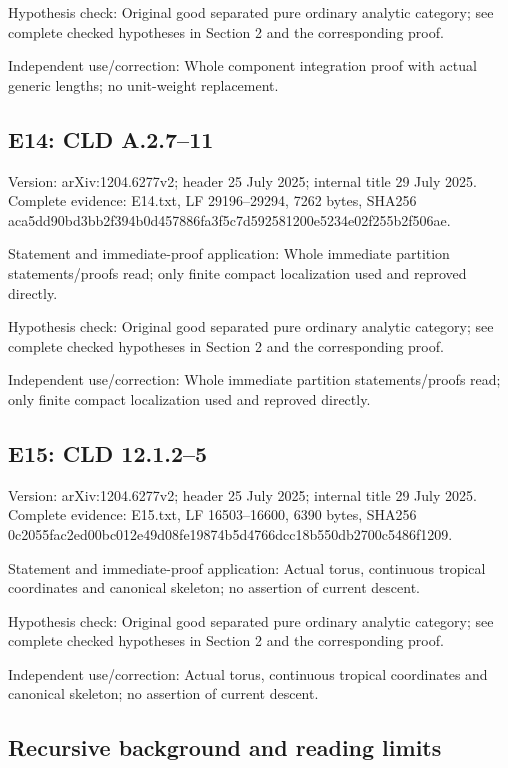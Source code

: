 \documentclass[11pt]{article}
\begin{document}
Hypothesis check: Original good separated pure ordinary analytic category; see complete checked hypotheses in Section 2 and the corresponding proof.

Independent use/correction: Whole component integration proof with actual generic lengths; no unit-weight replacement.

\subsection{E14: CLD A.2.7--11}

Version: arXiv:1204.6277v2; header 25 July 2025; internal title 29 July 2025. Complete evidence: E14.txt, LF 29196--29294, 7262 bytes, SHA256 aca5dd90bd3bb2f394b0d457886fa3f5c7d592581200e5234e02f255b2f506ae.

Statement and immediate-proof application: Whole immediate partition statements/proofs read; only finite compact localization used and reproved directly.

Hypothesis check: Original good separated pure ordinary analytic category; see complete checked hypotheses in Section 2 and the corresponding proof.

Independent use/correction: Whole immediate partition statements/proofs read; only finite compact localization used and reproved directly.

\subsection{E15: CLD 12.1.2--5}

Version: arXiv:1204.6277v2; header 25 July 2025; internal title 29 July 2025. Complete evidence: E15.txt, LF 16503--16600, 6390 bytes, SHA256 0c2055fac2ed00bc012e49d08fe19874b5d4766dcc18b550db2700c5486f1209.

Statement and immediate-proof application: Actual torus, continuous tropical coordinates and canonical skeleton; no assertion of current descent.

Hypothesis check: Original good separated pure ordinary analytic category; see complete checked hypotheses in Section 2 and the corresponding proof.

Independent use/correction: Actual torus, continuous tropical coordinates and canonical skeleton; no assertion of current descent.

\subsection{Recursive background and reading limits}
\end{document}
